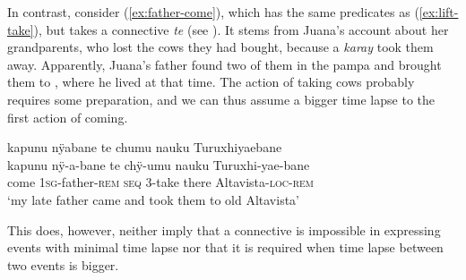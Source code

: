 In contrast, consider (\ref{ex:father-come}), which has the same predicates as (\ref{ex:lift-take}), but takes a  connective \textit{te} (see ). It stems from Juana’s account about her grandparents, who lost the cows they had bought, because a \textit{karay} took them away. Apparently, Juana’s father found two of them in the pampa and brought them to , where he lived at that time. The action of taking cows probably requires some preparation, and we can thus assume a bigger time lapse to the first action of coming.

\ea\label{ex:father-come}
\begingl
\glpreamble kapunu nÿabane te chumu nauku Turuxhiyaebane\\
\gla kapunu nÿ-a-bane te chÿ-umu nauku Turuxhi-yae-bane\\
\glb come 1\textsc{sg}-father-\textsc{rem} \textsc{seq} 3-take there Altavista-\textsc{loc}-\textsc{rem}\\
\glft ‘my late father came and took them to old Altavista’
\endgl
\trailingcitation{[jxx-e150925l-1.238]}
\xe


This does, however, neither imply that a connective is impossible in expressing  events with minimal time lapse nor that it is required when time lapse between two events is bigger.

